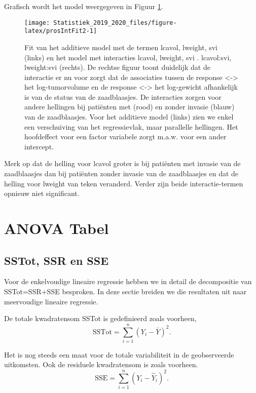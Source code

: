 \documentclass[12pt,dutch,coursenotes]{book}
\theoremstyle{definition}
\theoremstyle{definition}
\theoremstyle{definition}
\theoremstyle{remark}
\begin{document}
Grafisch wordt het model weergegeven in Figuur \ref{fig:prosIntFit2}.

\begin{figure}

{\centering \texttt{[image: Statistiek\_2019\_2020\_files/figure-latex/prosIntFit2-1]} 

}

\caption{Fit van het additieve model met de termen lcavol, lweight, svi (links) en het model met interacties lcavol, lweight, svi . lcavol:svi, lweight:svi (rechts). De rechtse figuur toont duidelijk dat de interactie er nu voor zorgt dat de associaties tussen de response <-> het log-tumorvolume en de response <-> het log-gewicht afhankelijk is van de status van de zaadblaasjes. De interacties zorgen voor andere hellingen bij patiënten met (rood) en zonder invasie (blauw) van de zaadblaasjes. Voor het additieve model (links) zien we enkel een verschuiving van het regressievlak, maar parallelle hellingen. Het hoofdeffect voor een factor variabele zorgt m.a.w. voor een ander intercept.}\label{fig:prosIntFit2}
\end{figure}

Merk op dat de helling voor lcavol groter is bij patiënten met invasie
van de zaadblaasjes dan bij patiënten zonder invasie van de zaadblaasjes
en dat de helling voor lweight van teken veranderd. Verder zijn beide
interactie-termen opnieuw niet significant.

\section{ANOVA Tabel}\label{anova-tabel-2}

\subsection{SSTot, SSR en SSE}\label{sstot-ssr-en-sse}

Voor de enkelvoudige lineaire regressie hebben we in detail de
decompositie van SSTot=SSR+SSE besproken. In deze sectie breiden we die
resultaten uit naar meervoudige lineaire regressie.

De totale kwadratensom SSTot is gedefinieerd zoals voorheen, \[
  \text{SSTot} = \sum_{i=1}^n (Y_i - \bar{Y})^2.
\]

Het is nog steeds een maat voor de totale variabiliteit in de
geobserveerde uitkomsten. Ook de residuele kwadratensom is zoals
voorheen. \[
  \text{SSE} = \sum_{i=1}^n (Y_i-\hat{Y}_i)^2.
\]
\end{document}
